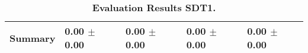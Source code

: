 \begin{table}[htb]
{\begin{tabular}{lllll}
\midrule
\textbf{Summary                                  } &  \phantom{0}0.00 $\pm$ \phantom{0}0.00 &             \phantom{0}0.00 $\pm$ \phantom{0}0.00 &  \phantom{0}0.00 $\pm$ \phantom{0}0.00 &  \phantom{0}0.00 $\pm$ \phantom{0}0.00 \\
\bottomrule
\end{tabular}%
}
\caption{\textbf{Evaluation Results SDT1.}}
\label{tab:eval-results}
\end{table}


